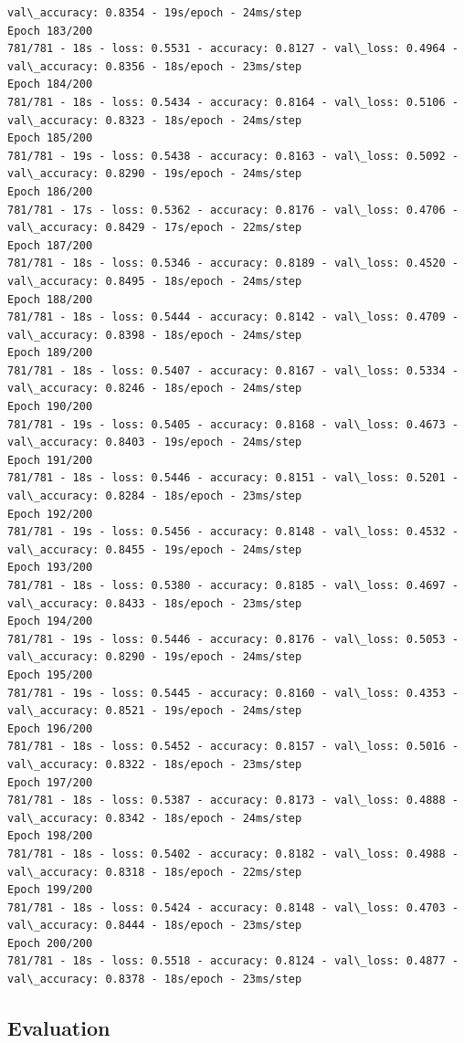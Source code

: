\documentclass[11pt]{article}
\begin{document}
\begin{Verbatim}[commandchars=\\\{\}]
val\_accuracy: 0.8354 - 19s/epoch - 24ms/step
Epoch 183/200
781/781 - 18s - loss: 0.5531 - accuracy: 0.8127 - val\_loss: 0.4964 -
val\_accuracy: 0.8356 - 18s/epoch - 23ms/step
Epoch 184/200
781/781 - 18s - loss: 0.5434 - accuracy: 0.8164 - val\_loss: 0.5106 -
val\_accuracy: 0.8323 - 18s/epoch - 24ms/step
Epoch 185/200
781/781 - 19s - loss: 0.5438 - accuracy: 0.8163 - val\_loss: 0.5092 -
val\_accuracy: 0.8290 - 19s/epoch - 24ms/step
Epoch 186/200
781/781 - 17s - loss: 0.5362 - accuracy: 0.8176 - val\_loss: 0.4706 -
val\_accuracy: 0.8429 - 17s/epoch - 22ms/step
Epoch 187/200
781/781 - 18s - loss: 0.5346 - accuracy: 0.8189 - val\_loss: 0.4520 -
val\_accuracy: 0.8495 - 18s/epoch - 24ms/step
Epoch 188/200
781/781 - 18s - loss: 0.5444 - accuracy: 0.8142 - val\_loss: 0.4709 -
val\_accuracy: 0.8398 - 18s/epoch - 24ms/step
Epoch 189/200
781/781 - 18s - loss: 0.5407 - accuracy: 0.8167 - val\_loss: 0.5334 -
val\_accuracy: 0.8246 - 18s/epoch - 24ms/step
Epoch 190/200
781/781 - 19s - loss: 0.5405 - accuracy: 0.8168 - val\_loss: 0.4673 -
val\_accuracy: 0.8403 - 19s/epoch - 24ms/step
Epoch 191/200
781/781 - 18s - loss: 0.5446 - accuracy: 0.8151 - val\_loss: 0.5201 -
val\_accuracy: 0.8284 - 18s/epoch - 23ms/step
Epoch 192/200
781/781 - 19s - loss: 0.5456 - accuracy: 0.8148 - val\_loss: 0.4532 -
val\_accuracy: 0.8455 - 19s/epoch - 24ms/step
Epoch 193/200
781/781 - 18s - loss: 0.5380 - accuracy: 0.8185 - val\_loss: 0.4697 -
val\_accuracy: 0.8433 - 18s/epoch - 23ms/step
Epoch 194/200
781/781 - 19s - loss: 0.5446 - accuracy: 0.8176 - val\_loss: 0.5053 -
val\_accuracy: 0.8290 - 19s/epoch - 24ms/step
Epoch 195/200
781/781 - 19s - loss: 0.5445 - accuracy: 0.8160 - val\_loss: 0.4353 -
val\_accuracy: 0.8521 - 19s/epoch - 24ms/step
Epoch 196/200
781/781 - 18s - loss: 0.5452 - accuracy: 0.8157 - val\_loss: 0.5016 -
val\_accuracy: 0.8322 - 18s/epoch - 23ms/step
Epoch 197/200
781/781 - 18s - loss: 0.5387 - accuracy: 0.8173 - val\_loss: 0.4888 -
val\_accuracy: 0.8342 - 18s/epoch - 24ms/step
Epoch 198/200
781/781 - 18s - loss: 0.5402 - accuracy: 0.8182 - val\_loss: 0.4988 -
val\_accuracy: 0.8318 - 18s/epoch - 22ms/step
Epoch 199/200
781/781 - 18s - loss: 0.5424 - accuracy: 0.8148 - val\_loss: 0.4703 -
val\_accuracy: 0.8444 - 18s/epoch - 23ms/step
Epoch 200/200
781/781 - 18s - loss: 0.5518 - accuracy: 0.8124 - val\_loss: 0.4877 -
val\_accuracy: 0.8378 - 18s/epoch - 23ms/step
    \end{Verbatim}

    \hypertarget{evaluation}{%
\subsection{Evaluation}\label{evaluation}}
\end{document}
